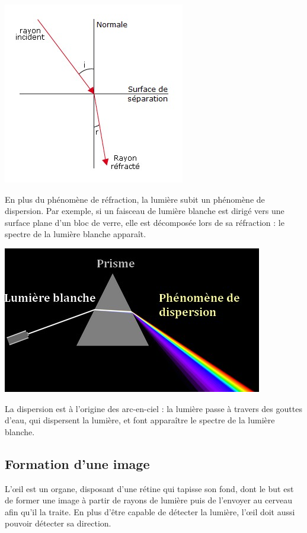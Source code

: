 \documentclass[a4paper, 12pt, onecolumn, openany]{report}
\begin{document}
	\begin{center}
	\includegraphics[scale=0.9]{refraction.jpg}
	\end{center}	
	
	 En plus du phénomène de réfraction, la lumière subit un phénomène de dispersion. Par exemple, si un faisceau de lumière blanche est dirigé vers une surface plane d'un bloc de verre, elle est décomposée lors de sa réfraction : le spectre de la lumière blanche apparaît.
	 
	 \includegraphics[scale=0.73]{dispersion.jpg} 
	 
	 La dispersion est à l’origine des arc-en-ciel : la lumière passe à travers des gouttes d’eau, qui dispersent la lumière, et font apparaître le spectre de la lumière blanche. 

\newpage
		\subsection{Formation d'une image}
		L’œil est un organe, disposant d’une rétine qui tapisse son fond, dont le but est de former une image à partir de rayons de lumière puis de l’envoyer au cerveau afin qu’il la traite. En plus d’être capable de détecter la lumière, l’œil doit aussi pouvoir détecter sa direction. 
		
\end{document}
